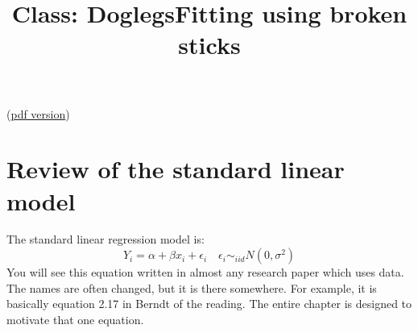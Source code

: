 \documentclass{article}
\begin{document}
\title{Class: Doglegs}

(\href{class_doglegs.pdf}{pdf version})

\title{Fitting using broken sticks}

\section{Review of the standard linear model}

The standard linear regression model is:
\begin{displaymath}
Y_i = \alpha + \beta x_i + \epsilon_i \quad \epsilon_i \sim_{iid}
N(0,\sigma^2)
\end{displaymath}
You will see this equation written in almost any research paper which
uses data.  The names are often changed, but it is there somewhere.
For example, it is basically equation 2.17 in Berndt of the reading.
The entire chapter is designed to motivate that one equation.
\end{document}

